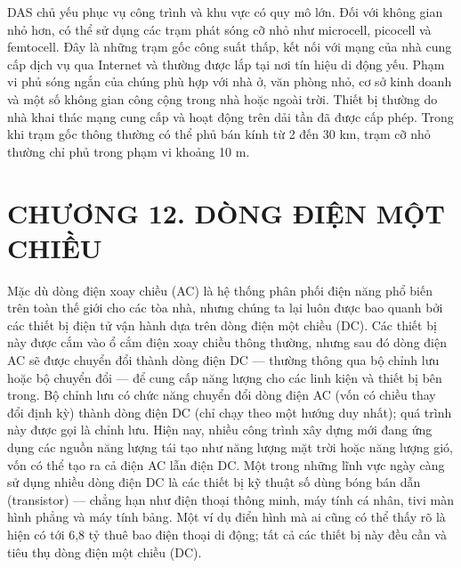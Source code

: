 \documentclass{thesis}
\begin{document}
DAS chủ yếu phục vụ công trình và khu vực có quy mô lớn. Đối với
không gian nhỏ hơn, có thể sử dụng các trạm phát sóng cỡ nhỏ như
microcell, picocell và femtocell. Đây là những trạm gốc công suất
thấp, kết nối với mạng của nhà cung cấp dịch vụ qua Internet và
thường được lắp tại nơi tín hiệu di động yếu. Phạm vi phủ sóng ngắn
của chúng phù hợp với nhà ở, văn phòng nhỏ, cơ sở kinh doanh và một
số không gian công cộng trong nhà hoặc ngoài trời. Thiết bị thường do
nhà khai thác mạng cung cấp và hoạt động trên dải tần đã được cấp
phép. Trong khi trạm gốc thông thường có thể phủ bán kính từ 2 đến 30
km, trạm cỡ nhỏ thường chỉ phủ trong phạm vi khoảng 10 m.

\newpage
\section*{CHƯƠNG 12. DÒNG ĐIỆN MỘT CHIỀU}
{}

\setcounter{section}{12}
\setcounter{subsection}{0}
\setcounter{figure}{0}
\setcounter{table}{0}

Mặc dù dòng điện xoay chiều (AC) là hệ thống phân phối điện năng phổ
biến trên toàn thế giới cho các tòa nhà, nhưng chúng ta lại luôn được
bao quanh bởi các thiết bị điện tử vận hành dựa trên dòng điện một
chiều (DC). Các thiết bị này được cắm vào ổ cắm điện xoay chiều thông
thường, nhưng sau đó dòng điện AC sẽ được chuyển đổi thành dòng điện
DC — thường thông qua bộ chỉnh lưu hoặc bộ chuyển đổi — để cung cấp
năng lượng cho các linh kiện và thiết bị bên trong. Bộ chỉnh lưu có
chức năng chuyển đổi dòng điện AC (vốn có chiều thay đổi định kỳ)
thành dòng điện DC (chỉ chạy theo một hướng duy nhất); quá trình này
được gọi là chỉnh lưu. Hiện nay, nhiều công trình xây dựng mới đang
ứng dụng các nguồn năng lượng tái tạo như năng lượng mặt trời hoặc
năng lượng gió, vốn có thể tạo ra cả điện AC lẫn điện DC. Một trong
những lĩnh vực ngày càng sử dụng nhiều dòng điện DC là các thiết bị
kỹ thuật số dùng bóng bán dẫn (transistor) — chẳng hạn như điện thoại
thông minh, máy tính cá nhân, tivi màn hình phẳng và máy tính bảng.
Một ví dụ điển hình mà ai cũng có thể thấy rõ là hiện có tới 6,8 tỷ
thuê bao điện thoại di động; tất cả các thiết bị này đều cần và tiêu
thụ dòng điện một chiều (DC).
\end{document}
